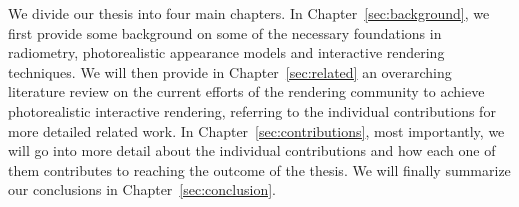 We divide our thesis into four main chapters. In Chapter~\ref{sec:background}, we first provide some background on some of the necessary foundations in radiometry, photorealistic appearance models and interactive rendering techniques. We will then provide in Chapter~\ref{sec:related} an overarching literature review on the current efforts of the rendering community to achieve photorealistic interactive rendering, referring to the individual contributions for more detailed related work. In Chapter~\ref{sec:contributions}, most importantly, we will go into more detail about the individual contributions and how each one of them contributes to reaching the outcome of the thesis. We will finally summarize our conclusions in Chapter~\ref{sec:conclusion}. 

